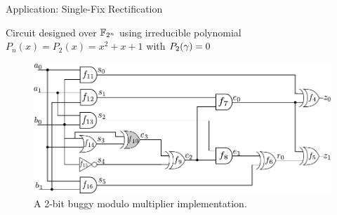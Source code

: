 

\begin{frame}{\large Application: Single-Fix Rectification}
\bi
	\item Circuit designed over ${\mathbb{F}}_{2^n}$ using irreducible polynomial $P_n(x) = P_2(x) = x^2+x+1$ with $P_2(\gamma)=0$
\ei
\begin{figure}[hbt]
    \begin{center}
    \includegraphics[scale = 0.64]{mas_red_bug-eps-converted-to.pdf}
    \end{center}
    \caption*{\small A 2-bit buggy modulo
      multiplier implementation. 
    }
    \label{fig:mas_both}
\end{figure}

\end{frame}

